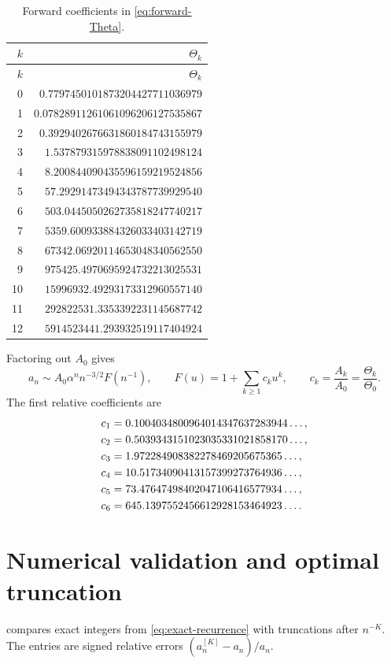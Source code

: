 \documentclass[11pt,a4paper,oneside,openany]{book}
\theoremstyle{definition}
\theoremstyle{remark}
\begin{document}
\begin{longtable}{r@{\qquad}r}
\caption{Forward coefficients in \cref{eq:forward-Theta}.}
\label{tab:forward-coeff}\\
\toprule
$k$ & $\Theta_k$\\
\midrule
\endfirsthead
\toprule
$k$ & $\Theta_k$\\
\midrule
\endhead
0  & $0.7797450101873204427711036979$\\
1  & $0.07828911261061096206127535867$\\
2  & $0.3929402676631860184743155979$\\
3  & $1.537879315978838091102498124$\\
4  & $8.200844090435596159219524856$\\
5  & $57.29291473494343787739929540$\\
6  & $503.0445050262735818247740217$\\
7  & $5359.600933884326033403142719$\\
8  & $67342.06920114653048340562550$\\
9  & $975425.4970695924732213025531$\\
10 & $15996932.49293173312960557140$\\
11 & $292822531.3353392231145687742$\\
12 & $5914523441.293932519117404924$\\
\bottomrule
\end{longtable}

Factoring out $A_0$ gives
\begin{equation}
 a_n\sim A_0\alpha^n n^{-3/2}F(n^{-1}),
 \qquad
 F(u)=1+\sum_{k\ge1}c_ku^k,
 \qquad c_k=\frac{A_k}{A_0}=\frac{\Theta_k}{\Theta_0}.
 \label{eq:F-forward}
\end{equation}
The first relative coefficients are
\begin{align}
 c_1={}&0.1004034800964014347637283944\ldots,\notag\\
 c_2={}&0.5039343151023035331021858170\ldots,\notag\\
 c_3={}&1.972284908382278469205675365\ldots,\notag\\
 c_4={}&10.51734090413157399273764936\ldots,\notag\\
 c_5={}&73.47647498402047106416577934\ldots,\notag\\
 c_6={}&645.1397552456612928153464923\ldots.
 \label{eq:c-numeric}
\end{align}

\section{Numerical validation and optimal truncation}
 compares exact integers from
\cref{eq:exact-recurrence} with truncations after $n^{-K}$.  The entries are
signed relative errors $(a_n^{[K]}-a_n)/a_n$.
\end{document}
